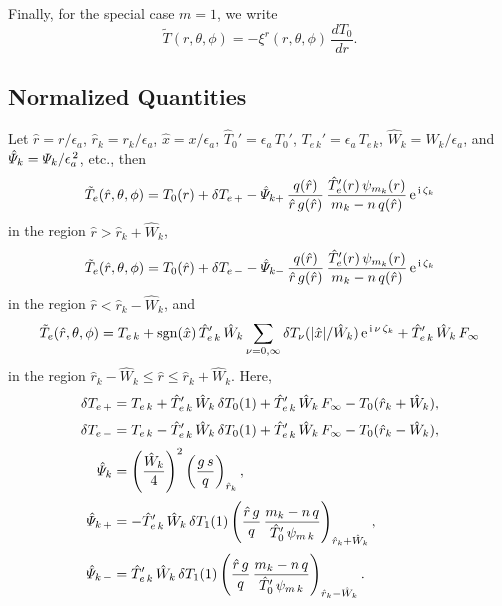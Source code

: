\documentclass[12pt,prb,aps,notitlepage]{revtex4-1}
\begin{document}
Finally, for the special case $m=1$, we write
\begin{equation}
\tilde{T}(r,\theta,\phi) = - \xi^r(r,\theta,\phi)\,\frac{dT_0}{dr}.
\end{equation}

\subsection{Normalized Quantities}
Let $\hat{r}=r/\epsilon_a$, $\hat{r}_k=r_k/\epsilon_a$, $\hat{x}= x/\epsilon_a$, $\hat{T}_0' = \epsilon_a\,T_0'$, $T_{e\,k}'=\epsilon_a\,T_{e\,k}$, 
$\hat{W}_k = W_k/\epsilon_a$, and $\hat{\mit\Psi}_k={\mit\Psi}_k/\epsilon_a^{\,2}$, etc., 
then
\begin{equation}
\tilde{T}_e(\hat{r},\theta,\phi) = T_0(r) + \delta T_{e\,+} - \hat{\mit\Psi}_{k+}\,\frac{q(\hat{r})}{\hat{r}\,g(\hat{r})}\,\frac{\hat{T}_e'(r)\,\psi_{m_k}(r)}{m_k-n\,q(\hat{r})}\,{\rm e}^{\,{\rm i}\,\zeta_k}
\end{equation}
in the region $\hat{r}>\hat{r}_k+\hat{W}_k$, 
\begin{equation}
\tilde{T}_e(\hat{r},\theta,\phi) = T_0(\hat{r}) + \delta T_{e\,-} - \hat{{\mit\Psi}}_{k-}\,\frac{q(\hat{r})}{\hat{r}\,g(\hat{r})}\,\frac{\hat{T}_e'(r)\,\psi_{m_k}(r)}{m_k-n\,q(\hat{r})}\,{\rm e}^{\,{\rm i}\,\zeta_k}
\end{equation}
in the region $\hat{r}< \hat{r}_k-\hat{W}_k$, and 
\begin{equation}
\tilde{T}_e(\hat{r}, \theta,\phi)=T_{e\,k} +{\rm sgn}(\hat{x})\,\hat{T}_{e\,k}'\,\hat{W}_k\sum_{\nu=0,\infty}\delta T_\nu(|\hat{x}|/\hat{W}_k)\,{\rm e}^{\,{\rm i}\,\nu\,\zeta_k}+\hat{T}_{e\,k}'\,\hat{W}_k\,F_\infty
\end{equation}
in the region $\hat{r}_k-\hat{W}_k \leq \hat{r}\leq \hat{r}_k+\hat{W}_k$. Here, 
\begin{align}
\delta T_{e\,+} &= T_{e\,k} + \hat{T}_{e\,k}'\,\hat{W}_k\,\delta T_0(1)+\hat{T}_{e\,k}'\,\hat{W}_k\,F_\infty - T_0(\hat{r}_k+\hat{W}_k),\\[0.5ex]
\delta T_{e\,-} &= T_{e\,k} - \hat{T}_{e\,k}'\,\hat{W}_k\,\delta T_0(1) +\hat{T}_{e\,k}'\,\hat{W}_k\,F_\infty- T_0(\hat{r}_k-\hat{W}_k),\\[0.5ex]
\hat{\mit\Psi}_k&=\left(\frac{\hat{W}_k}{4}\right)^2\left(\frac{g\,s}{q}\right)_{\hat{r}_k},\\[0.5ex]
\hat{\mit\Psi}_{k\,+} &= - \hat{T}_{e\,k}'\,\hat{W}_k\,\delta T_1(1)\left(\frac{\hat{r}\,g}{q}\,\frac{m_k-n\,q}{\hat{T}_0'\,\psi_{m\,k}}\right)_{\hat{r}_k+\hat{W}_k},\\[0.5ex]
\hat{\mit\Psi}_{k\,-} &= \hat{T}_{e\,k}'\,\hat{W}_k\,\delta T_1(1)\left(\frac{\hat{r}\,g}{q}\,\frac{m_k-n\,q}{\hat{T}_0'\,\psi_{m\,k}}\right)_{\hat{r}_k-\hat{W}_k}.
\end{align}
\end{document}
